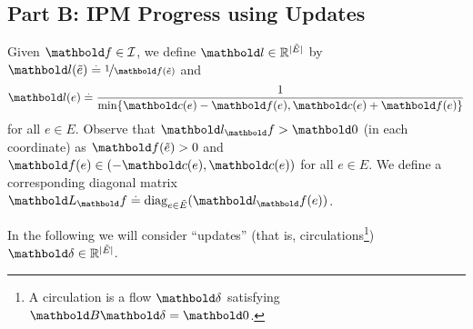 \documentclass[nobib]{tufte-handout}
\newcommand{\Etil}{\Tilde{E}}
\newcommand{\etil}{\Tilde{e}}
\newcommand{\barrierflowset}{\mathcal{I}}
\begin{document}
\subsection{Part B: IPM Progress using Updates}

Given $\vf \in \barrierflowset$, we define $\vl \in \R^{|\Etil|}$ by $\vl(\etil) \defeq \nicefrac{1}{\vf(\etil)}$ and \begin{align*}
    \vl(e) \defeq \frac{1}{\min\{\vc(e) - \vf(e), \vc(e) + \vf(e)\}}
\end{align*} for all $e \in E$. Observe that $\vl_\vf > \vZero$ (in each coordinate) as $\vf(\etil) > 0$ and $\vf(e) \in (-\vc(e), \vc(e))$ for all $e \in E$. We define a corresponding diagonal matrix $\mL_\vf \defeq \diag_{e \in \Etil}(\vl_\vf(e))$.

In the following we will consider ``updates'' (that is, circulations\footnote{A circulation is a flow $\vdelta$ satisfying $\mB\vdelta = \vZero$.}) $\vdelta \in \R^{|\Etil|}$.
\end{document}
